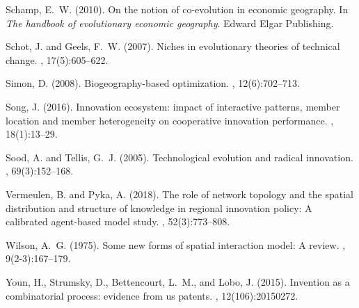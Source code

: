 \documentclass[letterpaper]{article}
\begin{document}
\begin{thebibliography}{}
Schamp, E.~W. (2010).
\newblock On the notion of co-evolution in economic geography.
\newblock In {\em The handbook of evolutionary economic geography}. Edward
  Elgar Publishing.

Schot, J. and Geels, F.~W. (2007).
\newblock Niches in evolutionary theories of technical change.
, 17(5):605--622.

Simon, D. (2008).
\newblock Biogeography-based optimization.
, 12(6):702--713.

Song, J. (2016).
\newblock Innovation ecosystem: impact of interactive patterns, member location
  and member heterogeneity on cooperative innovation performance.
, 18(1):13--29.

Sood, A. and Tellis, G.~J. (2005).
\newblock Technological evolution and radical innovation.
, 69(3):152--168.

Vermeulen, B. and Pyka, A. (2018).
\newblock The role of network topology and the spatial distribution and
  structure of knowledge in regional innovation policy: A calibrated
  agent-based model study.
, 52(3):773--808.

Wilson, A.~G. (1975).
\newblock Some new forms of spatial interaction model: A review.
, 9(2-3):167--179.

Youn, H., Strumsky, D., Bettencourt, L.~M., and Lobo, J. (2015).
\newblock Invention as a combinatorial process: evidence from us patents.
, 12(106):20150272.

\end{thebibliography}
\end{document}
